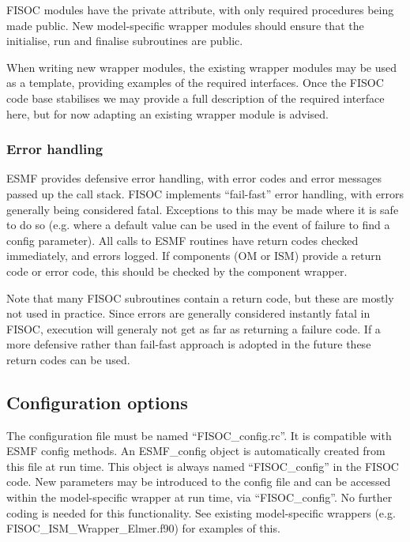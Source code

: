 \documentclass[12pt]{article}
\begin{document}
FISOC modules have the private attribute, with only required procedures being 
made public. 
New model-specific wrapper modules should ensure that the initialise, run and finalise 
subroutines are public. 

When writing new wrapper modules, the existing wrapper modules may be used as a template, 
providing examples of the required interfaces.
Once the FISOC code base stabilises we may provide a full description of the required interface 
here, but for now adapting an existing wrapper module is advised.


\subsubsection{Error handling}

ESMF provides defensive error handling, with error codes and error messages passed up the 
call stack. 
FISOC implements ``fail-fast'' error handling, with errors generally being considered 
fatal. 
Exceptions to this may be made where it is safe to do so (e.g. where a default value can be 
used in the event of  failure to find a config parameter).
All calls to ESMF routines have return codes checked immediately, and errors logged.
If components (OM or ISM) provide a return code or error code, 
this should be checked by the component wrapper.

Note that many FISOC subroutines contain a return code, but these are mostly not used in 
practice.  Since errors are generally considered instantly fatal in FISOC, execution will 
generaly not get as far as returning a failure code. 
If a more defensive rather than fail-fast approach is adopted in the future these return 
codes can be used.



\subsection{Configuration options}

The configuration file must be named ``FISOC\_config.rc''.  
It is compatible with ESMF config methods.  
An ESMF\_config object is automatically created from this file at run time.
This object is always named ``FISOC\_config'' in the FISOC code.
New parameters may be introduced to the config file and can be accessed 
within the model-specific wrapper at run time, via  ``FISOC\_config''. 
No further coding is needed for this functionality.
See existing model-specific wrappers (e.g. FISOC\_ISM\_Wrapper\_Elmer.f90) 
for examples of this.
\end{document}
